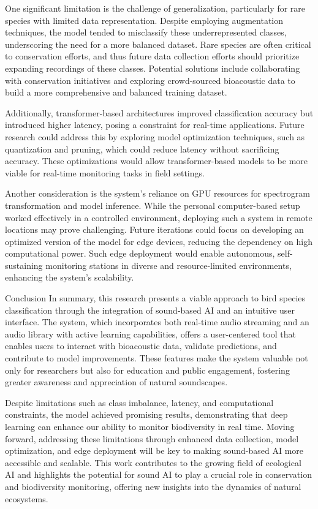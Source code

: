 One significant limitation is the challenge of generalization, particularly for rare species with limited data representation. Despite employing augmentation techniques, the model tended to misclassify these underrepresented classes, underscoring the need for a more balanced dataset. Rare species are often critical to conservation efforts, and thus future data collection efforts should prioritize expanding recordings of these classes. Potential solutions include collaborating with conservation initiatives and exploring crowd-sourced bioacoustic data to build a more comprehensive and balanced training dataset.

Additionally, transformer-based architectures improved classification accuracy but introduced higher latency, posing a constraint for real-time applications. Future research could address this by exploring model optimization techniques, such as quantization and pruning, which could reduce latency without sacrificing accuracy. These optimizations would allow transformer-based models to be more viable for real-time monitoring tasks in field settings.

Another consideration is the system's reliance on GPU resources for spectrogram transformation and model inference. While the personal computer-based setup worked effectively in a controlled environment, deploying such a system in remote locations may prove challenging. Future iterations could focus on developing an optimized version of the model for edge devices, reducing the dependency on high computational power. Such edge deployment would enable autonomous, self-sustaining monitoring stations in diverse and resource-limited environments, enhancing the system’s scalability.

Conclusion
In summary, this research presents a viable approach to bird species classification through the integration of sound-based AI and an intuitive user interface. The system, which incorporates both real-time audio streaming and an audio library with active learning capabilities, offers a user-centered tool that enables users to interact with bioacoustic data, validate predictions, and contribute to model improvements. These features make the system valuable not only for researchers but also for education and public engagement, fostering greater awareness and appreciation of natural soundscapes.

Despite limitations such as class imbalance, latency, and computational constraints, the model achieved promising results, demonstrating that deep learning can enhance our ability to monitor biodiversity in real time. Moving forward, addressing these limitations through enhanced data collection, model optimization, and edge deployment will be key to making sound-based AI more accessible and scalable. This work contributes to the growing field of ecological AI and highlights the potential for sound AI to play a crucial role in conservation and biodiversity monitoring, offering new insights into the dynamics of natural ecosystems.


